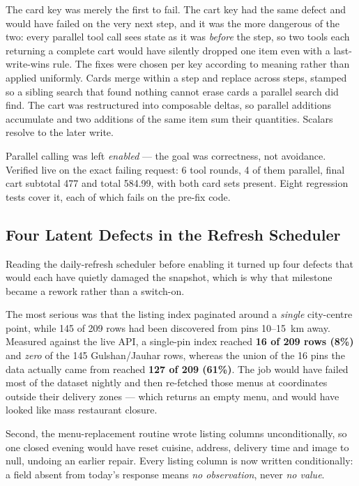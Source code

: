 \documentclass[11pt,a4paper]{article}
\begin{document}
The card key was merely the first to fail. The cart key had the same defect and
would have failed on the very next step, and it was the more dangerous of the
two: every parallel tool call sees state as it was \emph{before} the step, so
two tools each returning a complete cart would have silently dropped one item
even with a last-write-wins rule. The fixes were chosen per key according to
meaning rather than applied uniformly. Cards merge within a step and replace
across steps, stamped so a sibling search that found nothing cannot erase cards
a parallel search did find. The cart was restructured into composable
deltas, so parallel additions accumulate and two additions of the same item sum
their quantities. Scalars resolve to the later write.

Parallel calling was left \emph{enabled} --- the goal was correctness, not
avoidance. Verified live on the exact failing request: 6 tool rounds, 4 of them
parallel, final cart subtotal 477 and total 584.99, with both card sets
present. Eight regression tests cover it, each of which fails on the
pre-fix code.

\subsection{Four Latent Defects in the Refresh Scheduler}
\label{sec:m2}

Reading the daily-refresh scheduler before enabling it turned up four defects
that would each have quietly damaged the snapshot, which is why that milestone
became a rework rather than a switch-on.

The most serious was that the listing index paginated around a \emph{single}
city-centre point, while 145 of 209 rows had been discovered from pins
10--15~km away. Measured against the live API, a single-pin index reached
\textbf{16 of 209 rows (8\%)} and \emph{zero} of the 145 Gulshan/Jauhar rows,
whereas the union of the 16 pins the data actually came from reached
\textbf{127 of 209 (61\%)}. The job would have failed most of the dataset
nightly and then re-fetched those menus at coordinates outside their delivery
zones --- which returns an empty menu, and would have looked like mass
restaurant closure.

Second, the menu-replacement routine wrote listing columns unconditionally, so
one closed evening would have reset cuisine, address, delivery time and image
to null, undoing an earlier repair. Every listing column is now written
conditionally: a field absent from today's response means \emph{no
observation}, never \emph{no value}.
\end{document}
